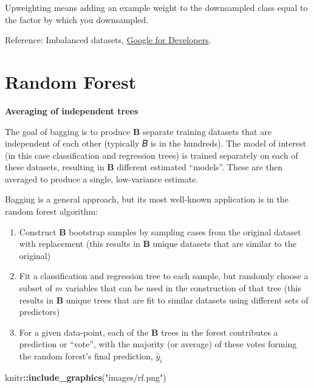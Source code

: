 \documentclass[
  a4paper,
  twoside,
  openright]{book}
\newenvironment{Shaded}{\begin{snugshade}}{\end{snugshade}}
\newcommand{\FunctionTok}[1]{\textcolor[rgb]{0.13,0.29,0.53}{\textbf{#1}}}
\newcommand{\NormalTok}[1]{#1}
\newcommand{\SpecialCharTok}[1]{\textcolor[rgb]{0.81,0.36,0.00}{\textbf{#1}}}
\newcommand{\StringTok}[1]{\textcolor[rgb]{0.31,0.60,0.02}{#1}}
\providecommand{\tightlist}{%
  \setlength{\itemsep}{0pt}\setlength{\parskip}{0pt}}
\theoremstyle{definition}
\theoremstyle{definition}
\theoremstyle{definition}
\theoremstyle{definition}
\theoremstyle{remark}
\begin{document}
Upweighting means adding an example weight to the downsampled class equal to the factor by which you downsampled.

Reference: Imbalanced datasets, \href{https://developers.google.com/machine-learning/crash-course/overfitting/imbalanced-datasets}{Google for Developers}.

\section{Random Forest}\label{random-forest}

\textbf{Averaging of independent trees}

The goal of bagging is to produce \(\boldsymbol{B}\) separate training datasets that are independent of each other (typically 𝐵 is in the hundreds). The model of interest (in this case classification and regression trees) is trained separately on each of these datasets, resulting in \(\boldsymbol{B}\) different estimated ``models''. These are then averaged to produce a single, low-variance estimate.

Bagging is a general approach, but its most well-known application is in the random forest algorithm:

\begin{enumerate}
\def\labelenumi{\arabic{enumi}.}
\tightlist
\item
  Construct \(\boldsymbol{B}\) bootstrap samples by sampling cases from the original dataset with replacement (this results in \(\boldsymbol{B}\) unique datasets that are similar to the original)
\item
  Fit a classification and regression tree to each sample, but randomly choose a subset of \(m\) variables that can be used in the construction of that tree (this results in \(\boldsymbol{B}\) unique trees that are fit to similar datasets using different sets of predictors)
\item
  For a given data-point, each of the \(\boldsymbol{B}\) trees in the forest contributes a prediction or ``vote'', with the majority (or average) of these votes forming the random forest's final prediction, \(\hat{y}_i\)
\end{enumerate}

\begin{Shaded}
\begin{Highlighting}[]
\NormalTok{knitr}\SpecialCharTok{::}\FunctionTok{include\_graphics}\NormalTok{(}\StringTok{"images/rf.png"}\NormalTok{)}
\end{Highlighting}
\end{Shaded}
\end{document}
